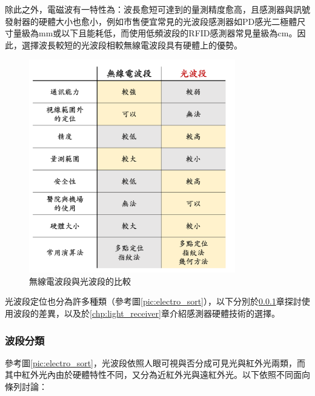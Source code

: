             除此之外，電磁波有一特性為：波長愈短可達到的量測精度愈高，且感測器與訊號發射器的硬體大小也愈小，例如市售便宜常見的光波段感測器如PD感光二極體尺寸量級為mm或以下\cite{datasheet:led_sfh4545}且能耗低，而使用低頻波段的RFID感測器常見量級為cm\cite{datasheet:rfid_tag}。因此，選擇波長較短的光波段相較無線電波段具有硬體上的優勢。

            \begin{figure}[h]
                \centering
                \includegraphics[width=9cm]{ch2pic/method_compare.png}
                \caption{無線電波段與光波段的比較}
                \label{pic:method_compare}
            \end{figure}


            光波段定位也分為許多種類（參考圖\ref{pic:electro_sort}），以下分別於\ref{chp:light_electro}章探討使用波段的差異，以及於\ref{chp:light_receiver}章介紹感測器硬體技術的選擇。


            \subsubsection{波段分類}

            \label{chp:light_electro}

            參考圖\ref{pic:electro_sort}，光波段依照人眼可視與否分成可見光與紅外光兩類，而其中紅外光內由於硬體特性不同，又分為近紅外光與遠紅外光。以下依照不同面向條列討論：

